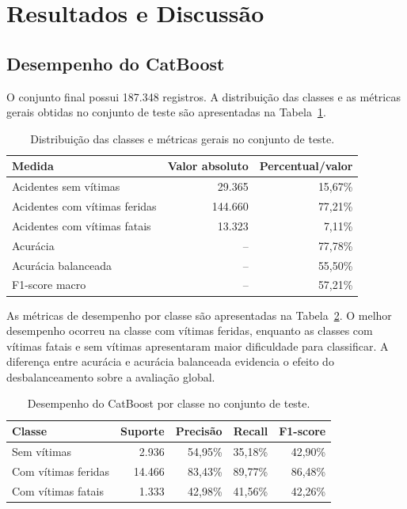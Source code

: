 \documentclass[12pt]{article}
\begin{document}
\section{Resultados e Discussão}
\subsection{Desempenho do CatBoost}
O conjunto final possui 187.348 registros. A distribuição das classes e as métricas gerais obtidas no conjunto de teste são apresentadas na Tabela~\ref{tab:metricas-gerais}.

\begin{table}[ht]
\centering
\caption{Distribuição das classes e métricas gerais no conjunto de teste.}
\label{tab:metricas-gerais}
\begin{tabular}{lrr}
\hline
\textbf{Medida} & \textbf{Valor absoluto} & \textbf{Percentual/valor} \\
\hline
Acidentes sem vítimas & 29.365 & 15,67\% \\
Acidentes com vítimas feridas & 144.660 & 77,21\% \\
Acidentes com vítimas fatais & 13.323 & 7,11\% \\
\hline
Acurácia & -- & 77,78\% \\
Acurácia balanceada & -- & 55,50\% \\
F1-score macro & -- & 57,21\% \\
\hline
\end{tabular}
\end{table}

As métricas de desempenho por classe são apresentadas na Tabela~\ref{tab:metricas-classes}. O melhor desempenho ocorreu na classe com vítimas feridas, enquanto as classes com vítimas fatais e sem vítimas apresentaram maior dificuldade para classificar. A diferença entre acurácia e acurácia balanceada evidencia o efeito do desbalanceamento sobre a avaliação global.

\begin{table}[ht]
\centering
\caption{Desempenho do CatBoost por classe no conjunto de teste.}
\label{tab:metricas-classes}
\begin{tabular}{lrrrr}
\hline
\textbf{Classe} & \textbf{Suporte} & \textbf{Precisão} & \textbf{Recall} & \textbf{F1-score} \\
\hline
Sem vítimas & 2.936 & 54,95\% & 35,18\% & 42,90\% \\
Com vítimas feridas & 14.466 & 83,43\% & 89,77\% & 86,48\% \\
Com vítimas fatais & 1.333 & 42,98\% & 41,56\% & 42,26\% \\
\hline
\end{tabular}
\end{table}
\end{document}
